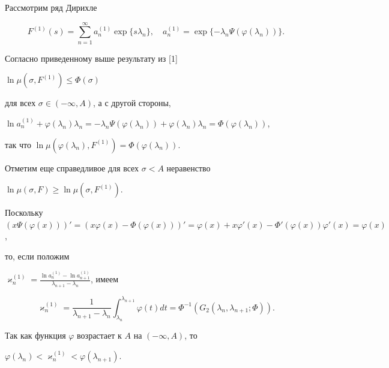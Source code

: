 \begin{pf} Рассмотрим ряд Дирихле


\begin{equation}


F^{(1)}(s)=\sum_{n=1}^{\infty}a^{(1)}_n\exp\{s\lambda_n\},\quad


a^{(1)}_n=\exp\{-\lambda_n\Psi(\varphi(\lambda_n))\}.


\end{equation}





Согласно приведенному выше результату из [1]


$\ln\mu(\sigma,F^{(1)})\le \Phi(\sigma)$ 


для всех $\sigma\in(-\infty,A)$, а с другой стороны, 


$\ln a^{(1)}_n+\varphi(\lambda_n)\lambda_n=


-\lambda_n\Psi(\varphi(\lambda_n))+\varphi(\lambda_n)\lambda_n


=\Phi(\varphi(\lambda_n))$,


так что $\ln\mu(\varphi(\lambda_n),F^{(1)})= \Phi(\varphi(\lambda_n))$.


Отметим еще справедливое для всех $\sigma<A$ неравенство


$\ln\mu(\sigma,F)\ge\ln\mu(\sigma,F^{(1)})$.





Поскольку $(x\Psi(\varphi(x)))'=(x\varphi(x)-\Phi(\varphi(x)))'=


\varphi(x)+x\varphi'(x)-\Phi'(\varphi(x))\varphi'(x)=\varphi(x)$,


то, если положим


$\varkappa^{(1)}_n=


\frac{\ln a^{(1)}_n-\ln a^{(1)}_{n+1}}{\lambda_{n+1}-\lambda_n}$, имеем


\begin{equation}


\varkappa^{(1)}_n=\frac{1}{\lambda_{n+1}-\lambda_n}


\int_{\lambda_n}^{\lambda_{n+1}}\varphi(t)dt=


\Phi^{-1}(G_2(\lambda_n,\lambda_{n+1};\Phi)).


\end{equation}


Так как функция $\varphi$ возрастает к $A$ на $(-\infty,A)$, то


$\varphi(\lambda_n)<\varkappa^{(1)}_n<\varphi(\lambda_{n+1})$.



\end{pf}
